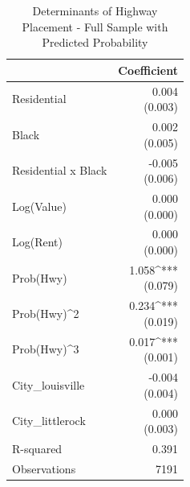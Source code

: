 \begin{table}[h]
\centering
\caption{Determinants of Highway Placement - Full Sample with Predicted Probability}
\label{tab:ml_prob_cov}
\begin{tabular*}{0.7\textwidth}{@{\extracolsep{\fill}}l*{1}{r}}
\toprule
 & Coefficient \\
\midrule
Residential & \makecell[tr]{0.004 \\ (0.003)} \\
Black & \makecell[tr]{0.002 \\ (0.005)} \\
Residential x Black & \makecell[tr]{-0.005 \\ (0.006)} \\
Log(Value) & \makecell[tr]{0.000 \\ (0.000)} \\
Log(Rent) & \makecell[tr]{0.000 \\ (0.000)} \\
Prob(Hwy) & \makecell[tr]{1.058^{***} \\ (0.079)} \\
Prob(Hwy)^2 & \makecell[tr]{0.234^{***} \\ (0.019)} \\
Prob(Hwy)^3 & \makecell[tr]{0.017^{***} \\ (0.001)} \\
City_louisville & \makecell[tr]{-0.004 \\ (0.004)} \\
City_littlerock & \makecell[tr]{0.000 \\ (0.003)} \\
R-squared & 0.391 \\
Observations & 7191 \\
\bottomrule
\end{tabular*}
\end{table}
